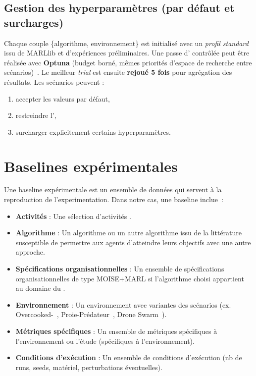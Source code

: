 \subsection{Gestion des hyperparamètres (par défaut et surcharges)}
Chaque couple \{algorithme, environnement\} est initialisé avec un \textit{profil standard} issu de MARLlib et d’expériences préliminaires.
Une passe d’ contrôlée peut être réalisée avec \textbf{Optuna} (budget borné, mêmes priorités d’espace de recherche entre scénarios)~\cite{akiba2019optuna}. Le meilleur \textit{trial} est ensuite \textbf{rejoué 5 fois} pour agrégation des résultats.
Les scénarios peuvent :
\begin{enumerate}[label=\alph*)]
  \item accepter les valeurs par défaut,
  \item restreindre l’,
  \item surcharger explicitement certains hyperparamètres.
\end{enumerate}

\section{Baselines expérimentales}

Une baseline expérimentale est un ensemble de données qui servent à la reproduction de l'experimentation. Dans notre cas, une baseline inclue~:
\begin{itemize}
  \item \textbf{Activités} : Une sélection d'activités .
  \item \textbf{Algorithme} : Un algorithme  ou un autre algorithme issu de la littérature susceptible de permettre aux agents d'atteindre leurs objectifs avec une autre approche.
  \item \textbf{Spécifications organisationnelles} : Un ensemble de spécifications organisationnelles de type MOISE+MARL si l'algorithme choisi appartient au domaine du .
  \item \textbf{Environnement} : Un environnement avec variantes des scénarios (ex. Overcooked-~\cite{overcookedai}, Proie-Prédateur~\cite{lowe2017multi}, Drone Swarm~\cite{cage_challenge_3_announcement}).
  \item \textbf{Métriques spécifiques} : Un ensemble de métriques spécifiques à l'environnement ou l'étude (spécifiques à l’environnement).
  \item \textbf{Conditions d’exécution} : Un ensemble de conditions d’exécution (nb de runs, seeds, matériel, perturbations éventuelles).
\end{itemize}


